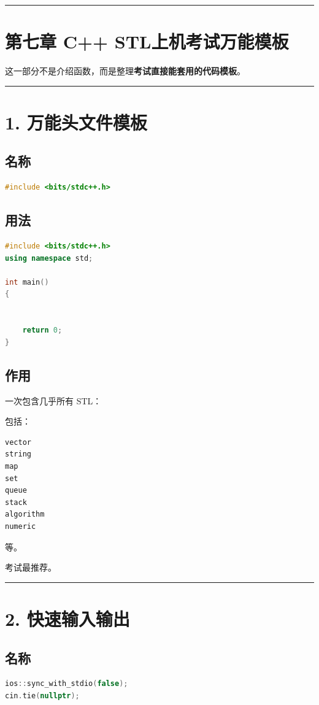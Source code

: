 \documentclass[10pt,twocolumn]{extarticle}
\begin{document}
\noindent\rule{\linewidth}{0.4pt}

\section{第七章 C++ STL上机考试万能模板}

这一部分不是介绍函数，而是整理\textbf{考试直接能套用的代码模板}。

\noindent\rule{\linewidth}{0.4pt}

\section{1. 万能头文件模板}

\subsection{名称}
\begin{lstlisting}[language=C++]
#include <bits/stdc++.h>
\end{lstlisting}

\subsection{用法}
\begin{lstlisting}[language=C++]
#include <bits/stdc++.h>
using namespace std;

int main()
{


    return 0;
}
\end{lstlisting}

\subsection{作用}
一次包含几乎所有 STL：

包括：
\begin{lstlisting}[language=C++]
vector
string
map
set
queue
stack
algorithm
numeric
\end{lstlisting}
等。

考试最推荐。

\noindent\rule{\linewidth}{0.4pt}

\section{2. 快速输入输出}

\subsection{名称}
\begin{lstlisting}[language=C++]
ios::sync_with_stdio(false);
cin.tie(nullptr);
\end{lstlisting}
\end{document}

